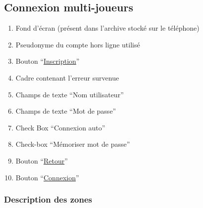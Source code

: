 \documentclass{report}
\begin{document}
\newpage

	\subsection{Connexion multi-joueurs}
	
		\hypertarget{Connexion multi-joueurs}{}
		\label{Connexion multi-joueurs}
	
		\begin{center}
					
		\end{center}
		
		\begin{enumerate}
		  \item Fond d'écran (présent dans l'archive stocké sur le téléphone)
		  \item Pseudonyme du compte hors ligne utilisé
		  \item Bouton ``\hyperlink{Creation compte multi-joueurs}{Inscription}''
		  \item Cadre contenant l'erreur survenue
		  \item Champs de texte ``Nom utilisateur''
		  \item Champs de texte ``Mot de passe''
		  \item Check Box ``Connexion auto''
		  \item Check-box ``Mémoriser mot de passe''
		  \item Bouton ``\hyperlink{Accueil}{Retour}''
		  \item Bouton ``\hyperlink{Accueil multi-joueurs}{Connexion}''
		\end{enumerate}

		\subsubsection{Description des zones}
		
\end{document}
